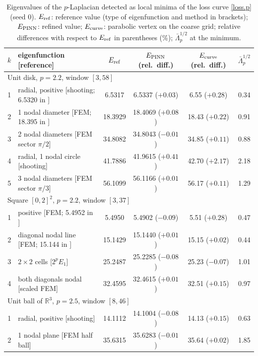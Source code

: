 \documentclass[10pt]{amsart}
\theoremstyle{definition}
\theoremstyle{remark}
\theoremstyle{plain}
\newcommand{\R}{\mathbb{R}}
\begin{document}
\begin{table}[tbp]
\centering\small
\caption{Eigenvalues of the $p$-Laplacian detected as local minima of the loss curve \eqref{loss.p} (seed 0). $E_{\rm ref}$: reference value (type of eigenfunction and method in brackets); $E_{\rm PINN}$: refined value; $E_{\rm curve}$: parabolic vertex on the coarse grid; relative differences with respect to $E_{\rm ref}$ in parentheses (\%); $\bar\Lambda_p^{1/2}$ at the minimum.}
\label{tab.plap}
\begin{tabular}{clcccc}
\toprule
$k$ & eigenfunction [reference] & $E_{\rm ref}$ & $E_{\rm PINN}$ (rel.\ diff.) & $E_{\rm curve}$ (rel.\ diff.) & $\bar\Lambda_p^{1/2}$ \\
\midrule
\multicolumn{6}{l}{Unit disk, $p=2.2$, window $[3,58]$}\\
1 & radial, positive [shooting; 6.5320 in \cite{HJ11}] & 6.5317 & 6.5337 ($+0.03$) & 6.55 ($+0.28$) & 0.34 \\
2 & 1 nodal diameter [FEM; 18.395 in \cite{HJ11}] & 18.3929 & 18.4069 ($+0.08$) & 18.43 ($+0.22$) & 0.91 \\
3 & 2 nodal diameters [FEM sector $\pi/2$] & 34.8082 & 34.8043 ($-0.01$) & 34.85 ($+0.11$) & 0.88 \\
4 & radial, 1 nodal circle [shooting] & 41.7886 & 41.9615 ($+0.41$) & 42.70 ($+2.17$) & 2.18 \\
5 & 3 nodal diameters [FEM sector $\pi/3$] & 56.1099 & 56.1166 ($+0.01$) & 56.17 ($+0.11$) & 1.29 \\
\midrule
\multicolumn{6}{l}{Square $[0,2]^2$, $p=2.2$, window $[3,37]$}\\
1 & positive [FEM; 5.4952 in \cite{HJ11}] & 5.4950 & 5.4902 ($-0.09$) & 5.51 ($+0.28$) & 0.47 \\
2 & diagonal nodal line [FEM; 15.144 in \cite{HJ11}] & 15.1429 & 15.1440 ($+0.01$) & 15.15 ($+0.02$) & 0.44 \\
3 & $2\times2$ cells [$2^{p}E_1$] & 25.2487 & 25.2285 ($-0.08$) & 25.23 ($-0.07$) & 1.01 \\
4 & both diagonals nodal [scaled FEM] & 32.4595 & 32.4615 ($+0.01$) & 32.51 ($+0.15$) & 0.97 \\
\midrule
\multicolumn{6}{l}{Unit ball of $\R^3$, $p=2.5$, window $[8,46]$}\\
1 & radial, positive [shooting] & 14.1112 & 14.1004 ($-0.08$) & 14.13 ($+0.15$) & 0.63 \\
2 & 1 nodal plane [FEM half ball] & 35.6315 & 35.6283 ($-0.01$) & 35.64 ($+0.02$) & 1.85 \\
\bottomrule
\end{tabular}
\end{table}
\end{document}
